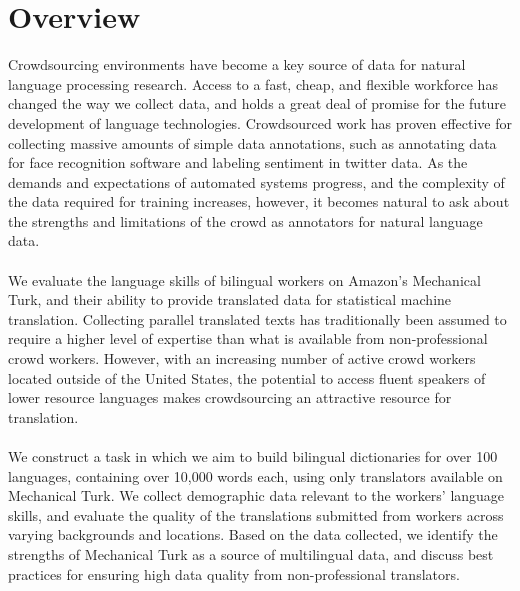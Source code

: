 \documentclass[11pt]{article}
\begin{document}
\section{Overview}
Crowdsourcing environments have become a key source of data for natural language processing research. Access to a fast, cheap, and flexible workforce has changed the way we collect data, and holds a great deal of promise for the future development of language technologies. Crowdsourced work has proven effective for collecting massive amounts of simple data annotations, such as annotating data for face recognition software and labeling sentiment in twitter data. As the demands and expectations of automated systems progress, and the complexity of the data required for training increases, however, it becomes natural to ask about the strengths and limitations of the crowd as annotators for natural language data.\\\\
We evaluate the language skills of bilingual workers on Amazon's Mechanical Turk, and their ability to provide translated data for statistical machine translation. Collecting parallel translated texts has traditionally been assumed to require a higher level of expertise than what is available from non-professional crowd workers. However, with an increasing number of active crowd workers located outside of the United States, the potential to access fluent speakers of lower resource languages makes crowdsourcing an attractive resource for translation.\\\\
We construct a task in which we aim to build bilingual dictionaries for over 100 languages, containing over 10,000 words each, using only translators available on Mechanical Turk. We collect demographic data relevant to the workers' language skills, and evaluate the quality of the translations submitted from workers across varying backgrounds and locations. Based on the data collected, we identify the strengths of Mechanical Turk as a source of multilingual data, and discuss best practices for ensuring high data quality from non-professional translators.
\end{document}
